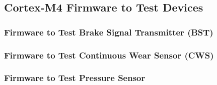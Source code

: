 \documentclass[8pt,compress]{beamer}
\begin{document}
\subsection{Cortex-M4 Firmware to Test Devices}
\begin{frame}
  \frametitle{Firmware to Test Brake Signal Transmitter (BST)}
\end{frame}

\begin{frame}
  \frametitle{Firmware to Test Continuous Wear Sensor (CWS)}
\end{frame}

\begin{frame}
  \frametitle{Firmware to Test Pressure Sensor}
\end{frame}
\end{document}
